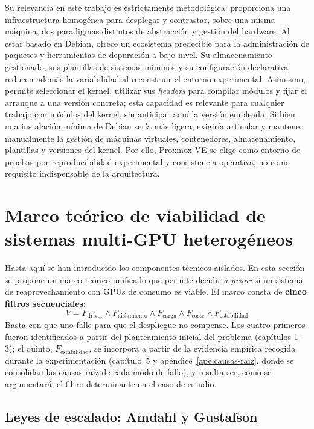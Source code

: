 Su relevancia en este trabajo es estrictamente metodológica: proporciona 
una infraestructura homogénea para desplegar y contrastar, sobre una misma máquina, dos 
paradigmas distintos de abstracción y gestión del hardware. Al estar basado en 
Debian, 
ofrece un ecosistema predecible para la administración de paquetes y herramientas de 
depuración a bajo nivel. Su almacenamiento gestionado, sus plantillas de sistemas mínimos y su configuración declarativa reducen además la variabilidad al reconstruir el entorno experimental. Asimismo, permite seleccionar el kernel, utilizar sus \textit{headers} para compilar módulos y fijar el arranque a una versión concreta; esta capacidad es relevante para cualquier trabajo con módulos del kernel, sin anticipar aquí la versión empleada.
Si bien una instalación mínima de Debian sería más ligera, 
exigiría articular y mantener manualmente la gestión de máquinas virtuales, contenedores, almacenamiento, plantillas y versiones del kernel. Por ello, Proxmox VE se elige como entorno de pruebas por reproducibilidad experimental y consistencia operativa, no como requisito indispensable de la arquitectura.

\section{Marco teórico de viabilidad de sistemas multi-GPU heterogéneos} \label{sec:marco_viabilidad} \label{sec:fundamentos}

Hasta aquí se han introducido los componentes técnicos aislados. En esta sección se propone un marco teórico unificado que permite decidir \textit{a priori} si un sistema de reaprovechamiento con GPUs de consumo es viable. El marco consta de \textbf{cinco filtros secuenciales}:
\begin{equation}
V = F_{\text{driver}} \land F_{\text{aislamiento}} \land F_{\text{carga}} \land F_{\text{coste}} \land F_{\text{estabilidad}}
\end{equation}
Basta con que uno falle para que el despliegue no compense. Los cuatro primeros fueron identificados a partir del planteamiento inicial del problema (capítulos 1--3); el quinto, $F_{\text{estabilidad}}$, se incorpora a partir de la evidencia empírica recogida durante la experimentación (capítulo~5 y apéndice~\ref{ape:causas-raiz}, donde se consolidan las causas raíz de cada modo de fallo), y resulta ser, como se argumentará, el filtro determinante en el caso de estudio.

\subsection{Leyes de escalado: Amdahl y Gustafson}

